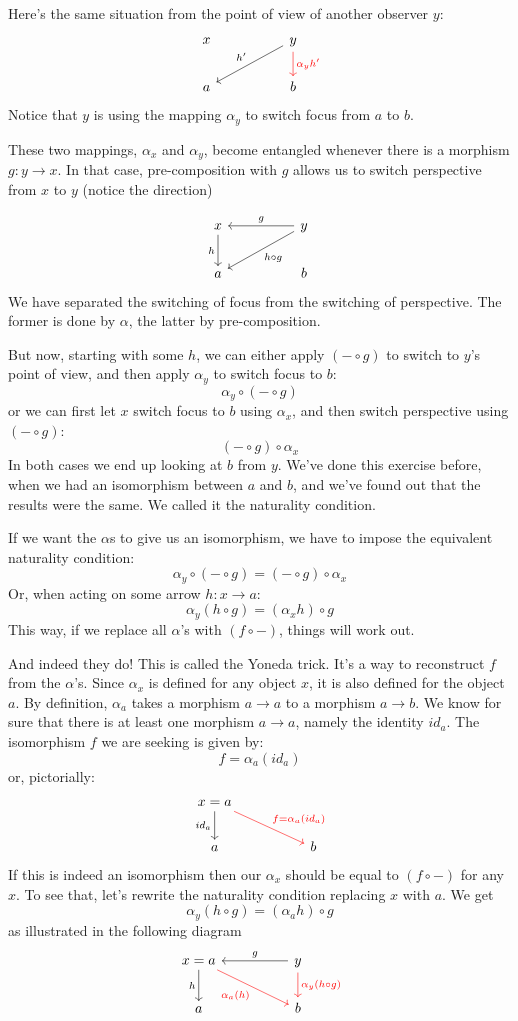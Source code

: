 \documentclass[DaoFP]{subfiles}
\begin{document}
Here's the same situation from the point of view of another observer $y$:
\[
 \begin{tikzcd}
 x
  && y
 \arrow[lld, "h'"']
 \arrow[d, red, "\alpha_y h'"]
 \\
 a
  && b
 \end{tikzcd}
\]
Notice that $y$ is using the mapping $\alpha_y$ to switch focus from $a$ to $b$. 

These two mappings, $\alpha_x$ and $\alpha_y$, become entangled whenever there is a morphism $g \colon y \to x$. In that case, pre-composition with $g$ allows us to switch perspective from $x$ to $y$ (notice the direction)

\[
 \begin{tikzcd}
 x
 \arrow[d, "h"']
 && y
 \arrow[ll, "g"']
 \arrow[lld, "h \circ g"]
 \\
 a
  && b
 \end{tikzcd}
\]
We have separated the switching of focus from the switching of perspective. The former is done by $\alpha$, the latter by pre-composition.

But now, starting with some $h$, we can either apply $(- \circ g)$ to switch to $y$'s point of view, and then apply $\alpha_y$ to switch focus to $b$:
\[ \alpha_y \circ (- \circ g) \]
or we can first let $x$ switch focus to $b$ using $\alpha_x$, and then switch perspective using $(- \circ g)$:
\[ (- \circ g) \circ \alpha_x \]
In both cases we end up looking at $b$ from $y$. We've done this exercise before, when we had an isomorphism between $a$ and $b$, and we've found out that the results were the same. We called it the naturality condition. 

If we want the $\alpha$s to give us an isomorphism, we have to impose the equivalent naturality condition:
\[ \alpha_y \circ (- \circ g) = (- \circ g) \circ \alpha_x \]
Or, when acting on some arrow $h \colon x \to a$:
\[\alpha_y(h \circ g) = (\alpha_x h) \circ g \]
This way, if we replace all $\alpha$'s with $(f \circ -)$, things will work out. 

And indeed they do! This is called the Yoneda trick. It's a way to reconstruct $f$ from the $\alpha$'s. Since $\alpha_x$ is defined for any object $x$, it is also defined for the object $a$. By definition, $\alpha_a$ takes a morphism $a \to a$ to a morphism $a \to b$. We know for sure that there is at least one morphism $a \to a$, namely the identity $id_a$. The isomorphism $f$ we are seeking is given by:
\[f = \alpha_a (id_a)\]
or, pictorially:
\[
 \begin{tikzcd}
x = a
 \arrow[d, "id_a"']
 \arrow[rrd, red, "f = \alpha_a (id_a)"]
  \\
 a
  && b
 \end{tikzcd}
\]
If this is indeed an isomorphism then our $\alpha_x$ should be equal to  $(f \circ -)$ for any $x$. To see that, let's rewrite the naturality condition replacing $x$ with $a$. We get
\[\alpha_y(h \circ g) = (\alpha_a h) \circ g \]
as illustrated in the following diagram
\[
 \begin{tikzcd}
 x = a
 \arrow[d, "h"']
 \arrow[rrd,  red, "\alpha_a (h)"']
 && y
 \arrow[ll, "g"']
 \arrow[d, red, "\alpha_y (h \circ g)"]
   \\
 a
  && b
 \end{tikzcd}
\]
\end{document}
